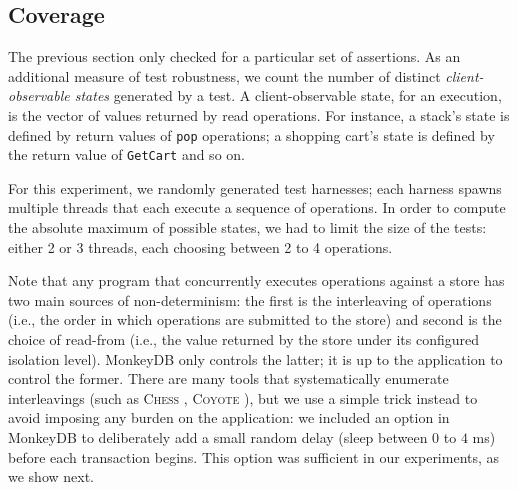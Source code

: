 %	
%		
%		
%		
%		
%		
%		
%		
%		
%	

\subsection{Coverage}
\label{sec:micro-coverage}

The previous section only checked for a particular set of assertions. As an additional measure of
test robustness, we count the number of distinct \textit{client-observable
states} generated by a test. A client-observable state, for an execution, is the vector of values returned by
read operations. For instance, a stack's state is defined by return values of 
\texttt{pop} operations; a shopping cart's state is defined by the return value
of \texttt{GetCart} and so on. 

For this experiment, we randomly generated test harnesses; each harness spawns
multiple threads that each execute a sequence of operations. In order to compute the absolute maximum
of possible states, we had to limit the size of the tests: either 2 or 3
threads, each choosing between 2 to 4 operations. 

Note that any program that concurrently executes operations against a store has
two main sources of non-determinism: the first is the interleaving of operations
(i.e., the order in which operations are submitted to the store) and second is
the choice of read-from (i.e., the value returned by the store under its
configured isolation level). MonkeyDB only controls the latter; it is up to the
application to control the former. There are many tools that systematically enumerate
interleavings (such as \textsc{Chess} \cite{DBLP:conf/pldi/MusuvathiQ08},
\textsc{Coyote} \cite{coyote-web}), but we use a simple trick
instead to avoid imposing any burden on the application: 
we included an option in MonkeyDB to deliberately add a small random
delay (sleep between $0$ to $4$ ms) before each transaction begins. This option 
was sufficient in our experiments, as we show next.

